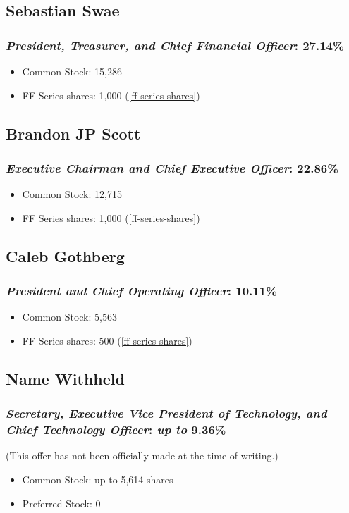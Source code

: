 \documentclass[11pt]{report}
\begin{document}
\subsection{Sebastian Swae}
\subsubsection{\textit{President, Treasurer, and Chief Financial Officer}: \textbf{27.14\%}}
\begin{itemize}
\item Common Stock: 15,286
\item FF Series shares: 1,000 (\ref{ff-series-shares})
\end{itemize}
\subsection{Brandon JP Scott}
\subsubsection{\textit{Executive Chairman and Chief Executive Officer}: \textbf{22.86\%}}
\begin{itemize}
\item Common Stock: 12,715
\item FF Series shares: 1,000 (\ref{ff-series-shares})
\end{itemize}
\subsection{Caleb Gothberg}
\subsubsection{\textit{President and Chief Operating Officer}: \textbf{10.11\%}}
\begin{itemize}
\item Common Stock: 5,563
\item FF Series shares: 500 (\ref{ff-series-shares})
\end{itemize}
\subsection{Name Withheld}
\subsubsection{\textit{Secretary, Executive Vice President of Technology, and Chief Technology Officer}: \emph{up to} \textbf{9.36\%}}
(This offer has not been officially made at the time of writing.)
\begin{itemize}
    \begin{itemize}
    \item 5.00\% awarded 45 days after first day of full time employment;
    \item 2.00\% awarded as PBRUs; and
    \item 2.36\% awarded as PCSUs.
    \end{itemize}
\item Common Stock: up to 5,614 shares
\item Preferred Stock: 0
\end{itemize}
\end{document}
